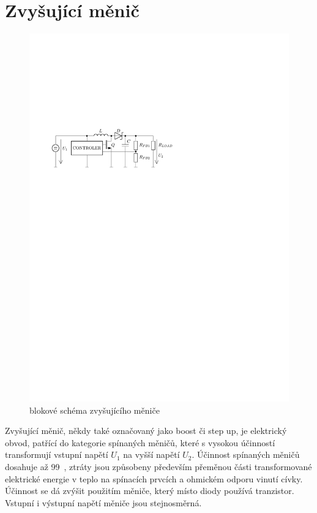 \section{Zvyšující měnič}
\begin{figure}[H]
    \begin{center}
        \includegraphics[width=\textwidth]{img/boost}
    \end{center}
    \caption{blokové schéma zvyšujícího měniče}
\end{figure}
Zvyšující měnič, někdy také označovaný jako boost či step up, je elektrický obvod, patřící do kategorie spínaných měničů, které s vysokou účinností transformují vstupní napětí $U_1$ na vyšší napětí $U_2$. Účinnost spínaných měničů dosahuje až 99~\jedn{\%}, ztráty jsou způsobeny především přeměnou části transformované elektrické energie v teplo na spínacích prvcích a ohmickém odporu vinutí cívky. Účinnost se dá zvýšit použitím měniče, který místo diody používá tranzistor. Vstupní i výstupní napětí měniče jsou stejnosměrná.

